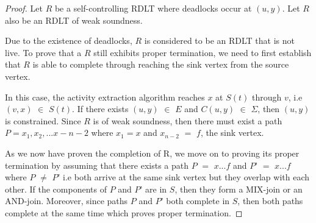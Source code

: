 \begin{proof}

    Let $ R $ be a self-controlling RDLT where deadlocks occur at $(u,y)$. Let $ R $ also be an RDLT of weak soundness.
    
    Due to the existence of deadlocks, $ R $ is considered to be an RDLT that is not live. To prove that a $ R $ still exhibits proper termination, we need to first establish that $ R $ is able to complete through reaching the sink vertex from the source vertex.
    
    In this case, the activity extraction algorithm reaches $ x $ at $S(t)$ through $v$, i.e $(v, x)$ $ \in $  $ S(t)$. If there exists $(u, y) $ $ \in $ $ E $ and $ C(u, y) $ $ \in $ $ \Sigma $, then $ (u,y) $ is constrained. Since $ R $ is of weak soundness, then there must exist a path $ P = x_1, x_2, ... x-{n-2} $ where $ x_1 = x $ and $ x_{n-2} $ $ = $ $ f $, the sink vertex.
    
    As we now have proven the completion of R, we move on to proving its proper termination by assuming that there exists a path $ P $ $ = $ $ x ... f $ and $ P’$ $ = $ $ x ... f $ where $ P $ $ \neq $ $ P’ $ i.e both arrive at the same sink vertex but they overlap with each other. If the components of $ P $ and $ P’ $ are in $ S $, then they form a MIX-join or an AND-join. Moreover, since paths $ P $ and $ P’ $ both complete in $ S $, then both paths complete at the same time which proves proper termination.
    
\end{proof}

